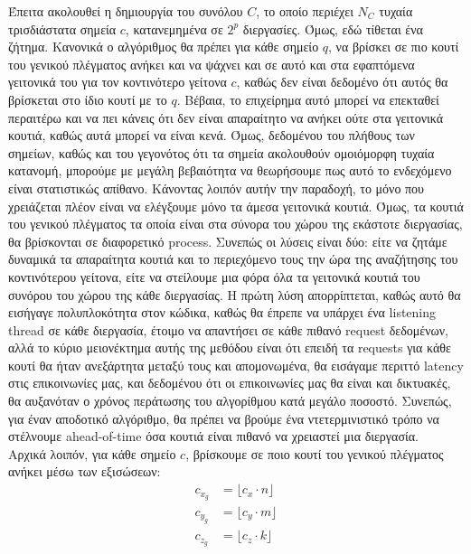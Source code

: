 \documentclass[11pt,a4paper,titlepage]{article}
\begin{document}
 	Έπειτα ακολουθεί η δημιουργία του συνόλου $C$, το οποίο περιέχει $N_C$ τυχαία τρισδιάστατα σημεία $c$, κατανεμημένα σε $2^p$ διεργασίες. Όμως, εδώ τίθεται ένα ζήτημα. Κανονικά ο αλγόριθμος θα πρέπει για κάθε σημείο $q$, να βρίσκει σε πιο κουτί του γενικού πλέγματος ανήκει και να ψάχνει και σε αυτό και στα εφαπτόμενα γειτονικά του για τον κοντινότερο γείτονα $c$, καθώς δεν είναι δεδομένο ότι αυτός θα βρίσκεται στο ίδιο κουτί με το $q$. Βέβαια, το επιχείρημα αυτό μπορεί να επεκταθεί περαιτέρω και να πει κάνεις ότι δεν είναι απαραίτητο να ανήκει ούτε στα γειτονικά κουτιά, καθώς αυτά μπορεί να είναι κενά. Όμως, δεδομένου του πλήθους των σημείων, καθώς και του γεγονότος ότι τα σημεία ακολουθούν ομοιόμορφη τυχαία κατανομή, μπορούμε με μεγάλη βεβαιότητα να θεωρήσουμε πως αυτό το ενδεχόμενο είναι στατιστικώς απίθανο. Κάνοντας λοιπόν αυτήν την παραδοχή, το μόνο που χρειάζεται πλέον είναι να ελέγξουμε μόνο τα άμεσα γειτονικά κουτιά. Όμως, τα κουτιά του γενικού πλέγματος τα οποία είναι στα σύνορα του χώρου της εκάστοτε διεργασίας, θα βρίσκονται σε διαφορετικό process. Συνεπώς οι λύσεις είναι δύο: είτε να ζητάμε δυναμικά τα απαραίτητα κουτιά και το περιεχόμενο τους την ώρα της αναζήτησης του κοντινότερου γείτονα, είτε να στείλουμε μια φόρα όλα τα γειτονικά κουτιά του συνόρου του χώρου της κάθε διεργασίας. Η πρώτη λύση απορρίπτεται, καθώς αυτό θα εισήγαγε πολυπλοκότητα στον κώδικα, καθώς θα έπρεπε να υπάρχει ένα listening thread σε κάθε διεργασία, έτοιμο να απαντήσει σε κάθε πιθανό request δεδομένων, αλλά το κύριο μειονέκτημα αυτής της μεθόδου είναι ότι επειδή τα requests για κάθε κουτί θα ήταν ανεξάρτητα μεταξύ τους και απομονωμένα, θα εισάγαμε περιττό latency στις επικοινωνίες μας, και δεδομένου ότι οι επικοινωνίες μας θα είναι και δικτυακές, θα αυξανόταν ο χρόνος περάτωσης του αλγορίθμου κατά μεγάλο ποσοστό. Συνεπώς, για έναν αποδοτικό αλγόριθμο, θα πρέπει να βρούμε ένα ντετερμινιστικό τρόπο να στέλνουμε ahead-of-time όσα κουτιά είναι πιθανό να χρειαστεί μια διεργασία.\\
 	 	
 	Αρχικά λοιπόν, για κάθε σημείο $c$, βρίσκουμε σε ποιο κουτί του γενικού πλέγματος ανήκει μέσω των εξισώσεων:
 	\begin{align}
	 	c_{x_g} &= \lfloor c_x \cdot n \rfloor \label{eq:16}\\
	 	c_{y_g} &= \lfloor c_y \cdot m \rfloor \label{eq:17}\\
	 	c_{z_g} &= \lfloor c_z \cdot k \rfloor \label{eq:18}
 	\end{align}\\[-2em]
 	
\end{document}
